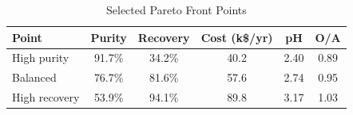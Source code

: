 \begin{table}[htbp]
\centering
\caption{Selected Pareto Front Points}
\label{tab:pareto}
\begin{tabular}{lccccc}
\toprule
Point & Purity & Recovery & Cost (k\$/yr) & pH & O/A \\
\midrule
High purity & 91.7\% & 34.2\% & 40.2 & 2.40 & 0.89 \\
Balanced & 76.7\% & 81.6\% & 57.6 & 2.74 & 0.95 \\
High recovery & 53.9\% & 94.1\% & 89.8 & 3.17 & 1.03 \\
\bottomrule
\end{tabular}
\end{table}